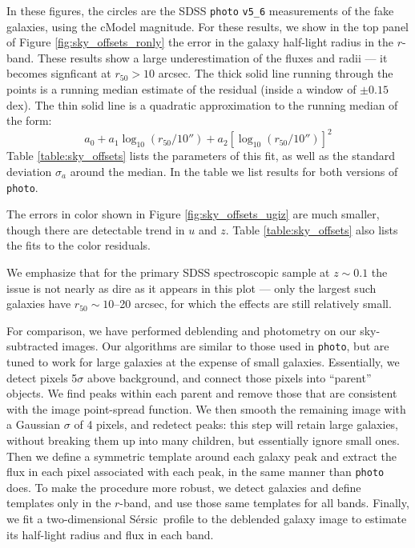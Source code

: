 \documentclass[10pt,preprint]{aastex}
\newcommand{\Sersic}{S\'ersic}
\begin{document}
In these figures, the circles are the SDSS {\tt photo} {\tt v5\_6}
measurements of the fake galaxies, using the cModel magnitude.  For
these results, we show in the top panel of Figure
\ref{fig:sky_offsets_ronly} the error in the galaxy half-light radius
in the $r$-band. These results show a large underestimation of the
fluxes and radii --- it becomes signficant at $r_{50}>10$ arcsec. The
thick solid line running through the points is a running median
estimate of the residual (inside a window of $\pm 0.15$ dex). The thin
solid line is a quadratic approximation to the running median of the
form:
\begin{equation}
\label{eq:sky_offsets_model}
a_0 + a_1 \log_{10}\left(r_{50}/10''\right)
+ a_2 \left[\log_{10}\left(r_{50}/10''\right)\right]^2
\end{equation}
Table \ref{table:sky_offsets} lists the parameters of this fit, as
well as the standard deviation $\sigma_a$ around the median. In the
table we list results for both versions of {\tt photo}.

The errors in color shown in Figure \ref{fig:sky_offsets_ugiz} are
much smaller, though there are detectable trend in $u$ and $z$. Table
\ref{table:sky_offsets} also lists the fits to the color residuals.

We emphasize that for the primary SDSS spectroscopic sample at $z\sim
0.1$ the issue is not nearly as dire as it appears in this plot ---
only the largest such galaxies have $r_{50}\sim 10$--20 arcsec, for
which the effects are still relatively small.

For comparison, we have performed deblending and photometry on our
sky-subtracted images.  Our algorithms are similar to those used in
{\tt photo}, but are tuned to work for large galaxies at the expense
of small galaxies. Essentially, we detect pixels 5$\sigma$ above
background, and connect those pixels into ``parent'' objects. We find
peaks within each parent and remove those that are consistent with the
image point-spread function. We then smooth the remaining image with a
Gaussian $\sigma$ of 4 pixels, and redetect peaks: this step will
retain large galaxies, without breaking them up into many children,
but essentially ignore small ones. Then we define a symmetric template
around each galaxy peak and extract the flux in each pixel associated
with each peak, in the same manner than {\tt photo} does. To make the
procedure more robust, we detect galaxies and define templates only in
the $r$-band, and use those same templates for all bands. Finally, we
fit a two-dimensional \Sersic\ profile to the deblended galaxy image
to estimate its half-light radius and flux in each band.
\end{document}
